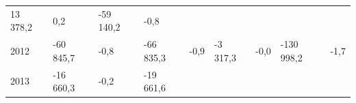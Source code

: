 \begin{longtable}[]{@{}lllllllll@{}}
\begin{minipage}[t]{0.12\columnwidth}
13 378,2\strut
\end{minipage} & \begin{minipage}[t]{0.06\columnwidth}\raggedright
0,2\strut
\end{minipage} & \begin{minipage}[t]{0.09\columnwidth}\raggedright
-59 140,2\strut
\end{minipage} & \begin{minipage}[t]{0.06\columnwidth}\raggedright
-0,8\strut
\end{minipage}\tabularnewline
\begin{minipage}[t]{0.05\columnwidth}\raggedright
2012\strut
\end{minipage} & \begin{minipage}[t]{0.10\columnwidth}\raggedright
-60 845,7\strut
\end{minipage} & \begin{minipage}[t]{0.06\columnwidth}\raggedright
-0,8\strut
\end{minipage} & \begin{minipage}[t]{0.16\columnwidth}\raggedright
-66 835,3\strut
\end{minipage} & \begin{minipage}[t]{0.06\columnwidth}\raggedright
-0,9\strut
\end{minipage} & \begin{minipage}[t]{0.12\columnwidth}\raggedright
-3 317,3\strut
\end{minipage} & \begin{minipage}[t]{0.06\columnwidth}\raggedright
-0,0\strut
\end{minipage} & \begin{minipage}[t]{0.09\columnwidth}\raggedright
-130 998,2\strut
\end{minipage} & \begin{minipage}[t]{0.06\columnwidth}\raggedright
-1,7\strut
\end{minipage}\tabularnewline
\begin{minipage}[t]{0.05\columnwidth}\raggedright
2013\strut
\end{minipage} & \begin{minipage}[t]{0.10\columnwidth}\raggedright
-16 660,3\strut
\end{minipage} & \begin{minipage}[t]{0.06\columnwidth}\raggedright
-0,2\strut
\end{minipage} & \begin{minipage}[t]{0.16\columnwidth}\raggedright
-19 661,6\strut

\end{minipage}
\end{longtable}
